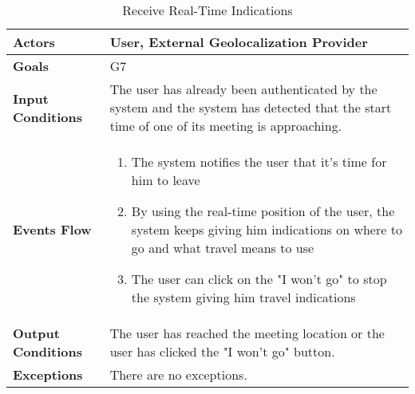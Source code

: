 \begin{table}[H]
	\centering
	\def\arraystretch{1.5}
	\begin{tabular}{|p{7cm}|p{7cm}|}
		\hline
		\textbf{Actors}            & User, External Geolocalization Provider		    \\ \hline
		\textbf{Goals}             & G7           \\ \hline
		\textbf{Input Conditions}  & The user has already been authenticated by the system and the system has detected that the start time of one of its meeting is approaching.           \\ \hline
		\textbf{Events Flow}       & 
			\begin{enumerate}[topsep=0pt, leftmargin=*]
				\item The system notifies the user that it's time for him to leave
				\item By using the real-time position of the user, the system keeps giving him indications on where to go and what travel means to use
				\item The user can click on the "I won't go" to stop the system giving him travel indications
			\end{enumerate}	        \\ \hline
		\textbf{Output Conditions} & The user has reached the meeting location or the user has clicked the "I won't go" button.           \\ \hline
		\textbf{Exceptions}        & There are no exceptions.           \\ \hline
	\end{tabular}
	\caption{Receive Real-Time Indications}
\end{table}


